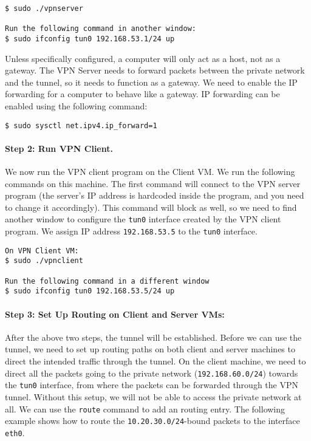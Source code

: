 \begin{lstlisting}
$ sudo ./vpnserver

Run the following command in another window:
$ sudo ifconfig tun0 192.168.53.1/24 up
\end{lstlisting}

Unless specifically configured, a computer will only act as a host, 
not as a gateway. The VPN Server needs to forward packets between the private network and the 
tunnel, so it needs to function as a gateway. We need to  
enable the IP forwarding for a computer to behave like a gateway. 
IP forwarding can be enabled
using the following command:

\begin{lstlisting}
$ sudo sysctl net.ipv4.ip_forward=1
\end{lstlisting}



\paragraph{Step 2: Run VPN Client.} We now run the VPN client program on the Client
VM.  We run the following commands on this machine. The first command
will connect to the VPN server program (the server's IP address is hardcoded
inside the program, and you need to change it accordingly).
This command will block as well, so we need to find another window to 
configure the \texttt{tun0} interface created by the VPN client program.  
We assign IP address \texttt{192.168.53.5} to the \texttt{tun0} interface.   


\begin{lstlisting}
On VPN Client VM:
$ sudo ./vpnclient 

Run the following command in a different window
$ sudo ifconfig tun0 192.168.53.5/24 up
\end{lstlisting}



\paragraph{Step 3: Set Up Routing on Client and Server VMs:} 
After the above two steps, the tunnel will be established. 
Before we can use the tunnel, we need to set up routing 
paths on both client and server machines to direct the intended traffic through
the tunnel. On the client machine, we need to direct all the packets going
to the private network ({\tt 192.168.60.0/24}) towards the \texttt{tun0}
interface, from where the packets can be forwarded through the VPN tunnel.
Without this setup, we will not be able to access the private network at
all. We can use the \texttt{route} command to add an routing entry. The
following example shows how to route the \texttt{10.20.30.0/24}-bound
packets to the interface \texttt{eth0}. 

